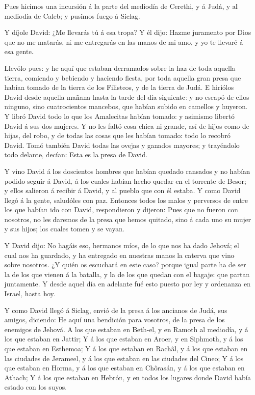  Pues hicimos una incursión á la parte del mediodía de
Cerethi, y á Judá, y al mediodía de Caleb; y pusimos fuego á Siclag.

 Y díjole David: ¿Me llevarás tú á esa tropa? Y él dijo:
Hazme juramento por Dios que no me matarás, ni me entregarás en las
manos de mi amo, y yo te llevaré á esa gente.

 Llevólo pues: y he aquí que estaban derramados sobre la
haz de toda aquella tierra, comiendo y bebiendo y haciendo fiesta, por
toda aquella gran presa que habían tomado de la tierra de los Filisteos,
y de la tierra de Judá.  E hiriólos David desde aquella
mañana hasta la tarde del día siguiente: y no escapó de ellos ninguno,
sino cuatrocientos mancebos, que habían subido en camellos y huyeron.
 Y libró David todo lo que los Amalecitas habían tomado: y
asimismo libertó David á sus dos mujeres.  Y no les faltó
cosa chica ni grande, así de hijos como de hijas, del robo, y de todas
las cosas que les habían tomado: todo lo recobró David. 
Tomó también David todas las ovejas y ganados mayores; y trayéndolo todo
delante, decían: Esta es la presa de David.

 Y vino David á los doscientos hombres que habían quedado
cansados y no habían podido seguir á David, á los cuales habían hecho
quedar en el torrente de Besor; y ellos salieron á recibir á David, y al
pueblo que con él estaba. Y como David llegó á la gente, saludóles con
paz.  Entonces todos los malos y perversos de entre los que
habían ido con David, respondieron y dijeron: Pues que no fueron con
nosotros, no les daremos de la presa que hemos quitado, sino á cada uno
su mujer y sus hijos; los cuales tomen y se vayan.

 Y David dijo: No hagáis eso, hermanos míos, de lo que nos
ha dado Jehová; el cual nos ha guardado, y ha entregado en nuestras
manos la caterva que vino sobre nosotros.  ¿Y quién os
escuchará en este caso? porque igual parte ha de ser la de los que
vienen á la batalla, y la de los que quedan con el bagaje: que partan
juntamente.  Y desde aquel día en adelante fué esto puesto
por ley y ordenanza en Israel, hasta hoy.

 Y como David llegó á Siclag, envió de la presa á los
ancianos de Judá, sus amigos, diciendo: He aquí una bendición para
vosotros, de la presa de los enemigos de Jehová.  A los que
estaban en Beth-el, y en Ramoth al mediodía, y á los que estaban en
Jattir;  Y á los que estaban en Aroer, y en Siphmoth, y á
los que estaban en Esthemoa;  Y á los que estaban en
Rachâl, y á los que estaban en las ciudades de Jerameel, y á los que
estaban en las ciudades del Cineo;  Y á los que estaban en
Horma, y á los que estaban en Chôrasán, y á los que estaban en Athach;
 Y á los que estaban en Hebrón, y en todos los lugares
donde David había estado con los suyos.

